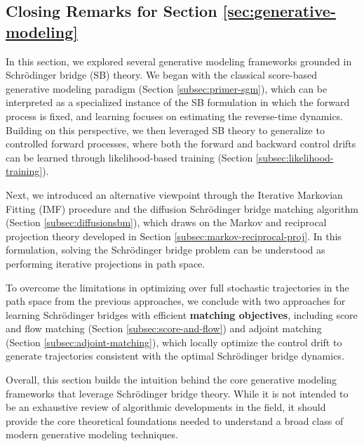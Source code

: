 \documentclass{article}
\begin{document}
\subsection{Closing Remarks for Section \ref{sec:generative-modeling}}
In this section, we explored several generative modeling frameworks grounded in Schrödinger bridge (SB) theory. We began with the classical score-based generative modeling paradigm (Section \ref{subsec:primer-sgm}), which can be interpreted as a specialized instance of the SB formulation in which the forward process is fixed, and learning focuses on estimating the reverse-time dynamics. Building on this perspective, we then leveraged SB theory to generalize to controlled forward processes, where both the forward and backward control drifts can be learned through likelihood-based training (Section \ref{subsec:likelihood-training}).

Next, we introduced an alternative viewpoint through the Iterative Markovian Fitting (IMF) procedure and the diffusion Schrödinger bridge matching algorithm (Section \ref{subsec:diffusionsbm}), which draws on the Markov and reciprocal projection theory developed in Section \ref{subsec:markov-reciprocal-proj}. In this formulation, solving the Schrödinger bridge problem can be understood as performing iterative projections in path space.

To overcome the limitations in optimizing over full stochastic trajectories in the path space from the previous approaches, we conclude with two approaches for learning Schrödinger bridges with efficient \textbf{matching objectives}, including score and flow matching (Section \ref{subsec:score-and-flow}) and adjoint matching (Section \ref{subsec:adjoint-matching}), which locally optimize the control drift to generate trajectories consistent with the optimal Schrödinger bridge dynamics.

Overall, this section builds the intuition behind the core generative modeling frameworks that leverage Schrödinger bridge theory. While it is not intended to be an exhaustive review of algorithmic developments in the field, it should provide the core theoretical foundations needed to understand a broad class of modern generative modeling techniques. 
\end{document}
